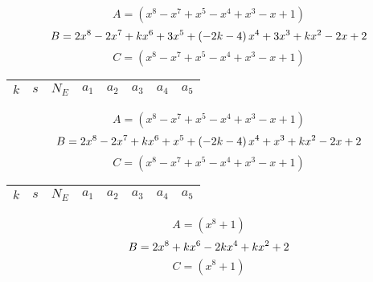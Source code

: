 \documentclass{amsart}
\begin{document}
$$A=(x^8
 - x^7
 + x^5
 - x^4
 + x^3
 - x
 + 1)$$
$$B=2\*x^8
 - 2\*x^7
 + k\*x^6
 + 3\*x^5
 + \left(-2\*k
 - 4\right) \*x^4
 + 3\*x^3
 + k\*x^2
 - 2\*x
 + 2$$
$$C=(x^8
 - x^7
 + x^5
 - x^4
 + x^3
 - x
 + 1)$$
\begin{longtable}{|l|l|l|lllll|}
\hline
$k$ & $s$ & $N_E$ & $a_1$ & $a_2$ & $a_3$ & $a_4$ & $a_5$\\
\hline
\hline
\end{longtable}
$$A=(x^8
 - x^7
 + x^5
 - x^4
 + x^3
 - x
 + 1)$$
$$B=2\*x^8
 - 2\*x^7
 + k\*x^6
 + x^5
 + \left(-2\*k
 - 4\right) \*x^4
 + x^3
 + k\*x^2
 - 2\*x
 + 2$$
$$C=(x^8
 - x^7
 + x^5
 - x^4
 + x^3
 - x
 + 1)$$
\begin{longtable}{|l|l|l|lllll|}
\hline
$k$ & $s$ & $N_E$ & $a_1$ & $a_2$ & $a_3$ & $a_4$ & $a_5$\\
\hline
\hline
\end{longtable}
$$A=(x^8
 + 1)$$
$$B=2\*x^8
 + k\*x^6
 - 2\*k\*x^4
 + k\*x^2
 + 2$$
$$C=(x^8
 + 1)$$
\end{document}
